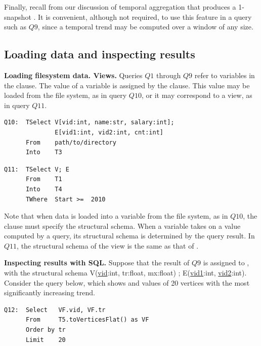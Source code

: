 Finally, recall from our discussion of temporal aggregation that
 produces a 1-snapshot \tg.  It is convenient,
although not required, to use this feature in a query such as $Q9$,
since a temporal trend may be computed over a window of any size.

\subsection{Loading data and inspecting results}
\label{sec:example:loadshow}

{\bf Loading filesystem data.  Views.}  Queries $Q1$ through $Q9$
refer to \tg variables in the  clause.  The value of a \tg
variable is assigned by the  clause.  This value may be
loaded from the file system, as in query $Q10$, or it may correspond to
a view, as in query $Q11$.

\begin{small}
\begin{verbatim}
Q10:  TSelect V[vid:int, name:str, salary:int]; 
              E[vid1:int, vid2:int, cnt:int]
      From    path/to/directory
      Into    T3
\end{verbatim}
\end{small}

\begin{small}
\begin{verbatim}
Q11:  TSelect V; E
      From    T1
      Into    T4
      TWhere  Start >=  2010 
\end{verbatim}
\end{small}

Note that when data is loaded into a \tg variable from the file
system, as in $Q10$, the  clause must specify the
structural schema.  When a \tg variable takes on a value computed by a
query, its structural schema is determined by the query result.  In
$Q11$, the structural schema of the view  is the same as
that of .

{\bf Inspecting results with SQL.}  Suppose that the result of $Q9$ is
assigned to , with the structural schema
V(\underline{vid}:int, tr:float, mx:float) ; E(\underline{vid1}:int,
\underline{vid2}:int).  Consider the  query below, which
shows  and  values of 20 vertices with the most
significantly increasing  trend.  

\begin{small}
\begin{verbatim}
Q12:  Select   VF.vid, VF.tr  
      From     T5.toVerticesFlat() as VF
      Order by tr
      Limit    20
\end{verbatim}
\end{small}

